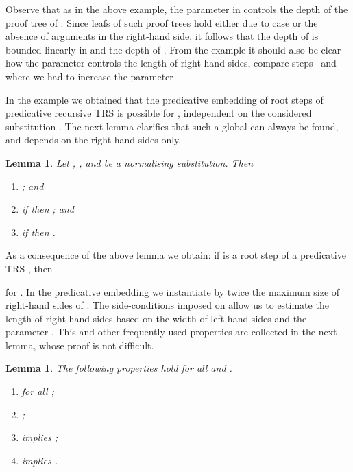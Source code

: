 \documentclass{LMCS}
\newtheorem{lemma}[thm]{Lemma}
\begin{document}
Observe that as in the above example, 
the parameter  in  controls 
the depth of the proof tree of . 
Since leafs of such proof trees hold either due to case 
or the absence of arguments in the right-hand side, it follows that 
the depth of  is bounded linearly 
in  and the depth of .
From the example it should also be clear how the parameter  
controls the length of right-hand sides, 
compare steps~ and~ where we had to increase 
the parameter .

In the example we obtained that the predicative embedding of 
root steps  
of predicative recursive TRS  is possible for , 
independent on the considered substitution . 
The next lemma clarifies that such a global  can always be found, 
and depends on the right-hand sides only. 

\begin{lemma}\label{l:int:len}
  Let , , and  be a normalising substitution. Then
  \begin{enumerate}[labelsep=*,leftmargin=*]
  \item\label{l:int:len:S} ; and
  \item\label{l:int:len:gsq} if   then ; and
  \item\label{l:int:len:gpop} if  then .
  \end{enumerate}
\end{lemma}






As a consequence of the above lemma we obtain: if  is a root step of 
a predicative TRS , then 
 
for . 
In the predicative embedding we instantiate 
 by twice the maximum size of right-hand sides of .
The side-conditions imposed on  
allow us to estimate the length of right-hand sides based on 
the width of left-hand sides and the parameter .
This and other frequently used properties are collected in the next lemma,
whose proof is not difficult.

\begin{lemma}\label{l:approx}
  The following properties hold for all  and .
  \begin{enumerate}[labelsep=*,leftmargin=*]
  \item\label{l:approx:kmon}  for all ;
  \item\label{l:approx:modeqi} ;
  \item\label{l:approx:bound}  implies ;
  \item\label{l:approx:subseq}  implies .
  \end{enumerate}
\end{lemma}
\end{document}
